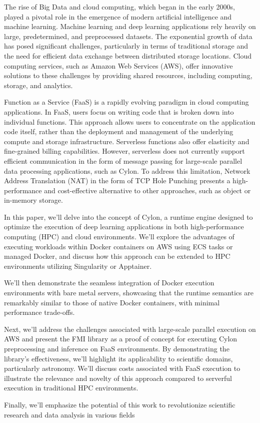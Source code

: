 The rise of Big Data and cloud computing, which began in the early 2000s, played a pivotal role in the emergence of modern artificial intelligence and machine learning. Machine learning and deep learning applications rely heavily on large, predetermined, and preprocessed datasets\cite{abeykoon2020data}. The exponential growth of data has posed significant challenges, particularly in terms of traditional storage and the need for efficient data exchange between distributed storage locations. Cloud computing services, such as Amazon Web Services (AWS), offer innovative solutions to these challenges by providing shared resources, including computing, storage, and analytics\cite{islamBigData}.

Function as a Service (FaaS) is a rapidly evolving paradigm in cloud computing applications. In FaaS, users focus on writing code that is broken down into individual functions. This approach allows users to concentrate on the application code itself, rather than the deployment and management of the underlying compute and storage infrastructure. Serverless functions also offer elasticity and fine-grained billing capabilities. However, serverless does not currently support efficient communication in the form of message passing for large-scale parallel data processing applications, such as Cylon\cite{copik2023fmi}. To address this limitation, Network Address Translation (NAT) in the form of TCP Hole Punching presents a high-performance and cost-effective alternative to other approaches, such as object or in-memory storage\cite{moyer2021punching}.

In this paper, we’ll delve into the concept of Cylon, a runtime engine designed to optimize the execution of deep learning applications in both high-performance computing (HPC) and cloud environments. We’ll explore the advantages of executing workloads within Docker containers on AWS using ECS tasks or managed Docker, and discuss how this approach can be extended to HPC environments utilizing Singularity or Apptainer.

We’ll then demonstrate the seamless integration of Docker execution environments with bare metal servers, showcasing that the runtime semantics are remarkably similar to those of native Docker containers, with minimal performance trade-offs.

Next, we’ll address the challenges associated with large-scale parallel execution on AWS and present the FMI library as a proof of concept for executing Cylon preprocessing and inference on FaaS environments. By demonstrating the library’s effectiveness, we’ll highlight its applicability to scientific domains, particularly astronomy.  We'll discuss costs associated with FaaS execution to illustrate the relevance and novelty of this approach compared to serverful execution in traditional HPC environments.

Finally, we’ll emphasize the potential of this work to revolutionize scientific research and data analysis in various fields

